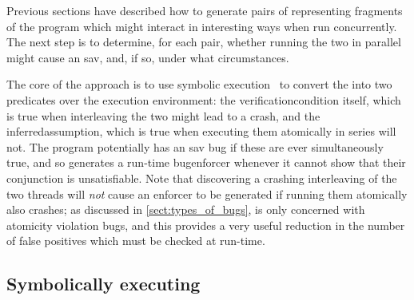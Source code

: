 Previous sections have described how to generate pairs of
{\StateMachines} representing fragments of the program which might
interact in interesting ways when run concurrently.  The next step is
to determine, for each pair, whether running the two {\StateMachines}
in parallel might cause an \gls{sav}, and, if so, under what
circumstances.

The core of the approach is to use symbolic execution~\cite{King1976}
to convert the {\StateMachines} into two predicates over the
{\StateMachine} execution environment: the \gls{verificationcondition}
itself, which is true when interleaving the two {\StateMachines} might
lead to a crash, and the \gls{inferredassumption}, which is true when
executing them atomically in series will not.  The program potentially
has an \gls{sav} bug if these are ever simultaneously true, and so
{\technique} generates a run-time \gls{bugenforcer} whenever it cannot
show that their conjunction is unsatisfiable.  Note that discovering a
crashing interleaving of the two threads will \emph{not} cause an
enforcer to be generated if running them atomically also crashes; as
discussed in \autoref{sect:types_of_bugs}, {\technique} is only
concerned with atomicity violation bugs, and this provides a very
useful reduction in the number of false positives which must be
checked at run-time.

\subsection{Symbolically executing {\StateMachines}}
\label{sect:derive:symbolic_execute}

